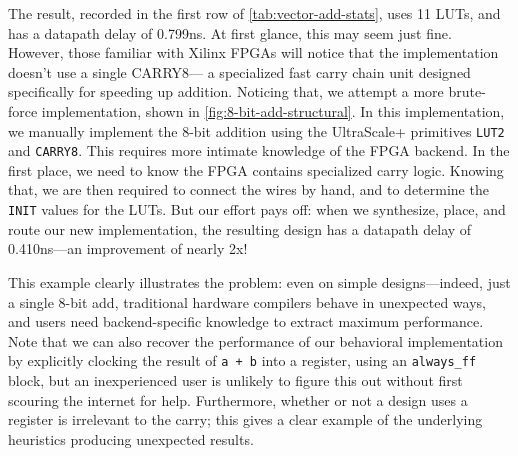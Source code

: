 The result,
  recorded in the first row of
  \cref{tab:vector-add-stats},
  uses 11 LUTs,
  and has a datapath delay of 0.799ns.
At first glance,
  this may seem just fine.
However, those familiar with
  Xilinx FPGAs
  will notice that the implementation
  doesn't use a single CARRY8---%
  a specialized fast carry chain unit
  designed specifically for speeding up
  addition.
Noticing that,
  we attempt a more brute-force implementation,
  shown in
  \cref{fig:8-bit-add-structural}.
In this implementation,
  we manually implement the 8-bit addition
  using the UltraScale+ primitives
  \texttt{LUT2} and \texttt{CARRY8}.
This requires more intimate
  knowledge of the FPGA backend.
In the first place, we need to know
  the FPGA contains
  specialized carry logic.
Knowing that,
  we are then required to connect the wires by hand,
  and to determine the \texttt{INIT}
  values for the LUTs.
But our effort pays off:
  when we synthesize, place, and route
  our new implementation,
  the resulting design
  has a datapath delay of
  0.410ns---an improvement of nearly 2x!
  
This example clearly illustrates the problem:
  even on simple designs---indeed,
  just a single 8-bit add,
  traditional hardware compilers behave
  in unexpected ways,
  and users need backend-specific knowledge
  to extract maximum performance.
Note that we can also recover the performance
  of our behavioral implementation
  by explicitly clocking the result of
  \texttt{a + b}
  into a register, using an
  \texttt{always_ff}
  block,
  but an inexperienced user is unlikely
  to figure this out
  without first scouring the internet
  for help.
Furthermore,
  whether or not a design uses a register
  is irrelevant
  to the carry;
  this gives a clear example of the
  underlying heuristics
  producing unexpected results.


